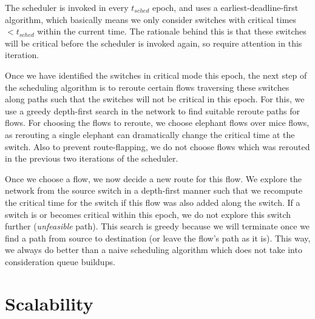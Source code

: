 The scheduler is invoked in every $t_{sched}$ epoch, and uses a 
earliest-deadline-first algorithm, which basically means we only consider
switches with critical times $< t_{sched}$ within the current time. The rationale 
behind this is that these switches will be critical before the scheduler is invoked 
again, so require attention in this iteration. 

Once we have identified the switches in critical mode this epoch,
the next step of the scheduling algorithm is to reroute certain flows 
traversing these switches along paths 
such that the switches will not be critical in this epoch. For this, we use 
a greedy depth-first search in the network to find suitable reroute paths for
flows. For choosing the flows to reroute, we choose elephant flows over mice flows,
as rerouting a single elephant can dramatically change the critical time at the switch.
Also to prevent route-flapping, we do not choose flows which was rerouted in the previous
two iterations of the scheduler. 

Once we choose a flow, we now decide a new route for this flow. We explore the 
network from the source switch in a depth-first manner such that we recompute the
critical time for the switch if this flow was also added along the switch. If a switch 
is or becomes critical within this epoch, we do not explore this switch further (\emph{unfeasible} path). This search is greedy because we will terminate once we find a path from source
 to destination (or leave the flow's path as it is). This way, we always do better than 
 a naive scheduling algorithm which does not take into consideration queue buildups.  
\section{Scalability}











